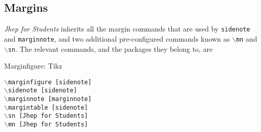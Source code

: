 \documentclass[10pt]{article}
\begin{document}
	\subsection{Margins}%
	\textit{Jhep for Students} inherits all the margin commands that are used by \texttt{sidenote} and \texttt{marginnote}, and two additional pre-configured commands known as \texttt{$\backslash$mn} and \texttt{$\backslash$sn}. The relevant commands, and the packages they belong to, are
	\begin{marginfigure}
		\begin{center}
		\end{center}
		\caption{Marginfigure: Tikz}
	\end{marginfigure}%
	\begin{center}
		\begin{multicols}{2}
		\noindent\texttt{$\backslash$marginfigure~[sidenote]\\
		$\backslash$sidenote~[sidenote]\\
		$\backslash$marginnote~[marginnote]\\
		$\backslash$margintable~[sidenote]\\
		$\backslash$sn~[Jhep for Students]\\
		$\backslash$mn~[Jhep for Students]\\
		}
	\end{multicols}
	\end{center}
\end{document}

